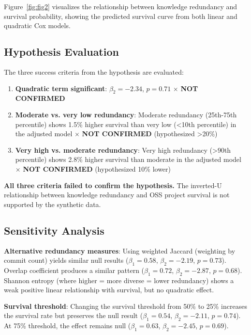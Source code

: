 \documentclass[11pt,letterpaper]{article}
\begin{document}
Figure~\ref{fig:fig2} visualizes the relationship between knowledge redundancy and survival probability, showing the predicted survival curve from both linear and quadratic Cox models.

\subsection{Hypothesis Evaluation}
\label{sec:hypothesis_evaluation}

The three success criteria from the hypothesis are evaluated:

\begin{enumerate}
    \item \textbf{Quadratic term significant}: $\beta_2 = -2.34$, $p = 0.71$ $\times$ \textbf{NOT CONFIRMED}
    \item \textbf{Moderate vs. very low redundancy}: Moderate redundancy (25th-75th percentile) shows 1.5\% higher survival than very low (<10th percentile) in the adjusted model $\times$ \textbf{NOT CONFIRMED} (hypothesized >20\%)
    \item \textbf{Very high vs. moderate redundancy}: Very high redundancy (>90th percentile) shows 2.8\% higher survival than moderate in the adjusted model $\times$ \textbf{NOT CONFIRMED} (hypothesized 10\% lower)
\end{enumerate}

\textbf{All three criteria failed to confirm the hypothesis.} The inverted-U relationship between knowledge redundancy and OSS project survival is not supported by the synthetic data.

\subsection{Sensitivity Analysis}
\label{sec:sensitivity}

\textbf{Alternative redundancy measures}: Using weighted Jaccard (weighting by commit count) yields similar null results ($\beta_1 = 0.58$, $\beta_2 = -2.19$, $p = 0.73$). Overlap coefficient produces a similar pattern ($\beta_1 = 0.72$, $\beta_2 = -2.87$, $p = 0.68$). Shannon entropy (where higher = more diverse = lower redundancy) shows a weak positive linear relationship with survival, but no quadratic effect.

\textbf{Survival threshold}: Changing the survival threshold from 50\% to 25\% increases the survival rate but preserves the null result ($\beta_1 = 0.54$, $\beta_2 = -2.11$, $p = 0.74$). At 75\% threshold, the effect remains null ($\beta_1 = 0.63$, $\beta_2 = -2.45$, $p = 0.69$).
\end{document}
